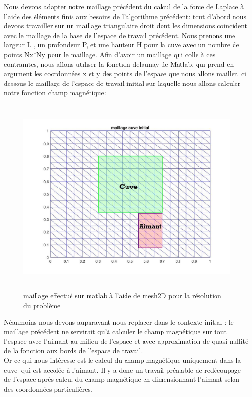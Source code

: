 \documentclass[a4paper,12pt,titlepage]{report}
\begin{document}
\begin{onehalfspace}
Nous devons adapter notre maillage précédent du calcul de la force de Laplace à l'aide des éléments finis aux besoins de l'algorithme précédent: 
\newline
\newline
tout d'abord nous devons travailler sur un maillage triangulaire droit dont les dimensions coincident avec le maillage de la base de l'espace de travail précédent. Nous prenons une largeur L , un profondeur P, et une hauteur H pour la cuve avec un nombre de points Nx*Ny pour le maillage.  Afin d'avoir un maillage qui colle à ces contraintes, nous allons utiliser la fonction delaunay de Matlab, qui prend en argument les coordonnées x et y des points de l'espace que nous allons mailler. 
\newline
ci dessous le maillage de l'espace de travail  initial sur laquelle nous allons calculer notre fonction champ magnétique:
\begin{figure}[!h]
\includegraphics[height = 10cm, keepaspectratio]{graphes/Maillage_initial1.jpg}
\caption{\label{figure 3 } maillage effectué sur matlab à l'aide de mesh2D pour la résolution du problème}

\end{figure}
\newline
Néanmoins nous devons auparavant nous replacer dans le contexte initial : le maillage précédent ne servirait qu'à calculer le champ magnétique sur tout l'espace avec  l'aimant au milieu de l'espace et avec approximation de quasi nullité de la fonction aux bords de l'espace de travail. 
\\
Or ce qui nous intéresse est le calcul du champ magnétique uniquement dans la cuve, qui est accolée à l'aimant. Il y a donc un travail préalable de redécoupage de l'espace après calcul du champ magnétique en dimensionnant l'aimant selon des coordonnées particulières. 
\newline



\end{onehalfspace}
\end{document}
